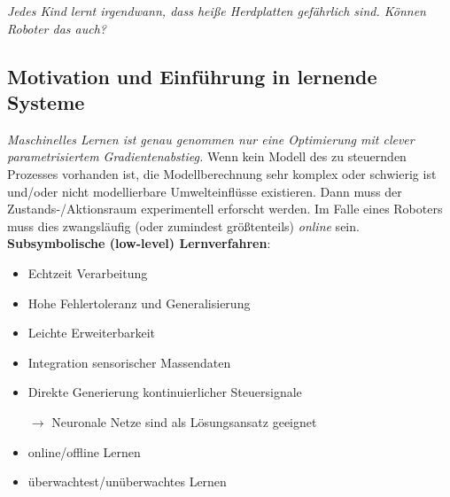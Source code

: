 \emph{Jedes Kind lernt irgendwann, dass heiße Herdplatten gefährlich sind. Können Roboter das auch?}
\subsection{Motivation und Einführung in lernende Systeme}
\emph{Maschinelles Lernen ist genau genommen nur eine Optimierung mit clever parametrisiertem Gradientenabstieg.}
Wenn kein Modell des zu steuernden Prozesses vorhanden ist, die Modellberechnung sehr komplex oder schwierig ist und/oder nicht modellierbare Umwelteinflüsse existieren.
Dann muss der Zustands-/Aktionsraum experimentell \glqq erforscht\grqq{} werden.
Im Falle eines Roboters muss dies zwangsläufig (oder zumindest größtenteils) \textit{online} sein.\\
%
\textbf{Subsymbolische (low-level) Lernverfahren}:
\begin{itemize}
	\item Echtzeit Verarbeitung
	\item Hohe Fehlertoleranz und Generalisierung
	\item Leichte Erweiterbarkeit
	\item Integration sensorischer Massendaten
	\item Direkte Generierung kontinuierlicher Steuersignale
	\item[$\rightarrow$] Neuronale Netze sind als Lösungsansatz geeignet
	\item online/offline Lernen
	\item überwachtest/unüberwachtes Lernen
\end{itemize}

